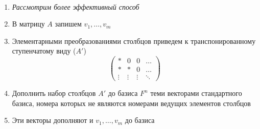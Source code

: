 \begin{problem}
\begin{example}
    \end{example}

    \bigskip

    \begin{solution}~

        \begin{enumerate}
            \item \textit{Рассмотрим более эффективный способ}
            \item В матрицу $A$ запишем $v_1, \dots, v_m$
            \item Элементарными преобразованиями столбцов приведем к транспонированному ступенчатому виду ($A'$)
            $$\begin{pmatrix}
                * & 0 & 0 & \dots \\
                * & * & 0 & \dots \\
                \vdots & \vdots & \vdots & \ddots
            \end{pmatrix}$$
            \item Дополнить набор столбцов $A'$ до базиса $F^n$ теми векторами стандартного базиса, номера которых не являются номерами ведущих элементов столбцов
            \item Эти векторы дополняют и $v_1, \dots, v_m$ до базиса
        \end{enumerate}
        
    \end{solution}

    \bigskip

    \begin{example}~


\end{example}
\end{problem}
